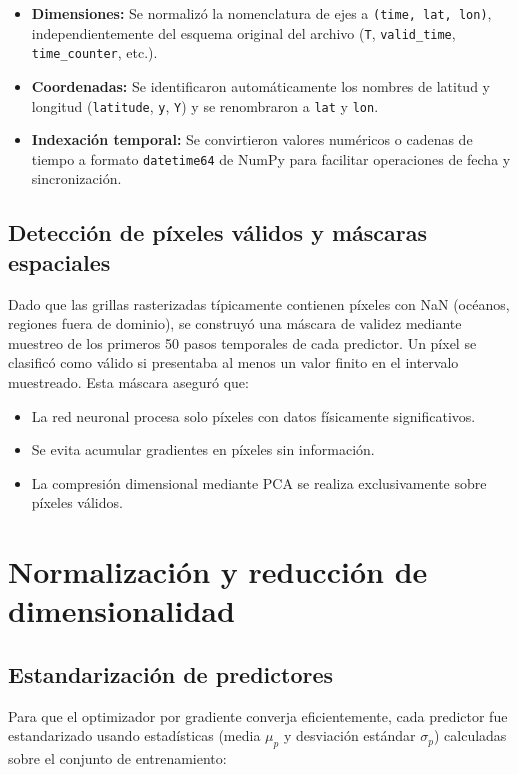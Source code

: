 \begin{itemize}
    \item \textbf{Dimensiones:} Se normalizó la nomenclatura de ejes a \texttt{(time, lat, lon)}, independientemente del esquema original del archivo (\texttt{T}, \texttt{valid\_time}, \texttt{time\_counter}, etc.).
    \item \textbf{Coordenadas:} Se identificaron automáticamente los nombres de latitud y longitud (\texttt{latitude}, \texttt{y}, \texttt{Y}) y se renombraron a \texttt{lat} y \texttt{lon}.
    \item \textbf{Indexación temporal:} Se convirtieron valores numéricos o cadenas de tiempo a formato \texttt{datetime64} de NumPy para facilitar operaciones de fecha y sincronización.
\end{itemize}

\subsection{Detección de píxeles válidos y máscaras espaciales}
Dado que las grillas rasterizadas típicamente contienen píxeles con NaN (océanos, regiones fuera de dominio), se construyó una máscara de validez mediante muestreo de los primeros 50 pasos temporales de cada predictor. Un píxel se clasificó como válido si presentaba al menos un valor finito en el intervalo muestreado. Esta máscara aseguró que:

\begin{itemize}
    \item La red neuronal procesa solo píxeles con datos físicamente significativos.
    \item Se evita acumular gradientes en píxeles sin información.
    \item La compresión dimensional mediante PCA se realiza exclusivamente sobre píxeles válidos.
\end{itemize}

\section{Normalización y reducción de dimensionalidad}
\label{sec:normalizacion_pca}

\subsection{Estandarización de predictores}
Para que el optimizador por gradiente converja eficientemente, cada predictor fue estandarizado usando estadísticas (media $\mu_p$ y desviación estándar $\sigma_p$) calculadas sobre el conjunto de entrenamiento:

